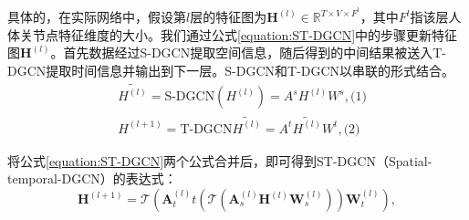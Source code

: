 具体的，在实际网络中，假设第$l$层的特征图为$\mathbf{H}^{(l)}\in \mathbb{R}^{T\times V \times F^l}$，其中$F^l$指该层人体关节点特征维度的大小。我们通过公式\ref{equation:ST-DGCN}中的步骤更新特征图$\mathbf{H}^{(l)}$。首先数据经过S-DGCN提取空间信息，随后得到的中间结果被送入T-DGCN提取时间信息并输出到下一层。S-DGCN和T-DGCN以串联的形式结合。
\begin{equation}
    \begin{aligned}
        & \widetilde{H^{(l)}} = \text{S-DGCN}(H^{(l)}) = A^s H^{(l)} W^s, \text{(1)}
        \\
        & H^{(l+1)} = \text{T-DGCN}\widetilde{H^{(l)}} = A^t \widetilde{H^{(l)}} W^t, \text{(2)}
    \end{aligned}
    \label{equation:ST-DGCN}
\end{equation}

将公式\ref{equation:ST-DGCN}两个公式合并后，即可得到ST-DGCN（Spatial-temporal-DGCN）的表达式：
\begin{equation}
    \mathbf{H}^{(l+1)} = \mathcal{T}\left(
    \mathbf{A}_{t}^{(l)}t
    \left(
    \mathcal{T}
    \left(
    \mathbf{A}_{s}^{(l)}\mathbf{H}^{(l)}\mathbf{W}_s^{(l)}
    \right)
    \right)
    \mathbf{W}_t^{(l)}
    \right),
    \label{equation:ST-DGCN_ensemble}
\end{equation}
